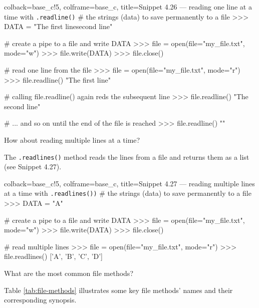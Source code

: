 \documentclass[a4paper,11pt]{book}
\newcommand{\question}[1]{%
    \begin{tcolorbox}[colback=comp_c!10,colframe=comp_c,sidebyside align=top,width=\linewidth,before skip=1ex]
        #1
    \end{tcolorbox}
    \switchcolumn%
}
\newcommand{\note}[1]{%
    \begin{tcolorbox}[colback=white!0,colframe=white!10,width=\linewidth,before skip=1ex]
        #1
    \end{tcolorbox}
}
\begin{document}
\begin{pythoncode}[linenos=true,]{colback=base_c!5, colframe=base_c, title=\sffamily Snippet 4.26 --- reading one line at a time with \texttt{.readline()}}
# the strings (data) to save permanently to a file
>>> DATA = "The first line\nThe second line" 

# create a pipe to a file and write DATA
>>> file = open(file="my_file.txt", mode="w")
>>> file.write(DATA)
>>> file.close()

# read one line from the file
>>> file = open(file="my_file.txt", mode="r")
>>> file.readline()
"The first line\n"

# calling file.readline() again reds the subsequent line 
>>> file.readline()
"The second line"

# ... and so on until the end of the file is reached
>>> file.readline()
""
\end{pythoncode}

\begin{paracol}{2}
	\question{\raggedright How about reading multiple lines at a time?}
	\note{The \texttt{.readlines()} method reads the lines from a file and returns them as a list (see Snippet 4.27).}
\end{paracol}
\clearpage

\begin{pythoncode}[linenos=true,]{colback=base_c!5, colframe=base_c, title=\sffamily Snippet 4.27 --- reading multiple lines at a time with \texttt{.readlines())}}
# the strings (data) to save permanently to a file
>>> DATA = "A\nB\nC\nD" 

# create a pipe to a file and write DATA
>>> file = open(file="my_file.txt", mode="w")
>>> file.write(DATA)
>>> file.close()

# read multiple lines 
>>> file = open(file="my_file.txt", mode="r")
>>> file.readlines()
['A\n', 'B\n', 'C\n', 'D']

\end{pythoncode}	

\begin{paracol}{2}
	\question{\raggedright What are the most common file methods?}
	\note{Table \ref{tab:file-methods} illustrates some key file methods' names and their corresponding synopsis.}
\end{paracol}
\end{document}
